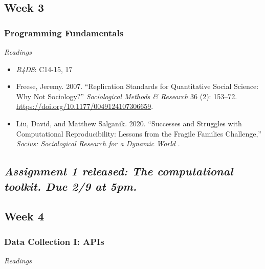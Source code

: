 \documentclass[
  10pt,
]{article}
\providecommand{\tightlist}{%
  \setlength{\itemsep}{0pt}\setlength{\parskip}{0pt}}
\begin{document}
\hypertarget{week-3}{%
\subsection{Week 3}\label{week-3}}

\hypertarget{programming-fundamentals}{%
\subsubsection{Programming
Fundamentals}\label{programming-fundamentals}}

\emph{Readings}

\begin{itemize}
\tightlist
\item
  \emph{R4DS}: C14-15, 17
\item
  Freese, Jeremy. 2007. ``Replication Standards for Quantitative Social
  Science: Why Not Sociology?'' \emph{Sociological Methods \& Research}
  36 (2): 153--72. \url{https://doi.org/10.1177/0049124107306659}.
\item
  Liu, David, and Matthew Salganik. 2020. ``Successes and Struggles with
  Computational Reproducibility: Lessons from the Fragile Families
  Challenge,'' \emph{Socius: Sociological Research for a Dynamic World}
  .
\end{itemize}

\hypertarget{assignment-1-released-the-computational-toolkit.-due-29-at-5pm.}{%
\subsection{\texorpdfstring{\emph{Assignment 1 released: The
computational toolkit. Due 2/9 at
5pm.}}{Assignment 1 released: The computational toolkit. Due 2/9 at 5pm.}}\label{assignment-1-released-the-computational-toolkit.-due-29-at-5pm.}}

\hypertarget{week-4}{%
\subsection{Week 4}\label{week-4}}

\hypertarget{data-collection-i-apis}{%
\subsubsection{Data Collection I: APIs}\label{data-collection-i-apis}}

\emph{Readings}
\end{document}
